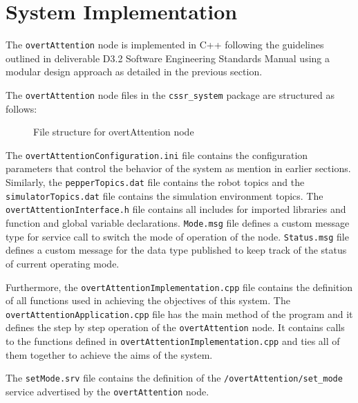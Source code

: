 \documentclass{CSSRforAfrica}
\begin{document}
\newpage
\section{System Implementation}
The \texttt{overtAttention} node is implemented in C++ following the guidelines outlined in deliverable D3.2 Software Engineering Standards Manual using a modular design approach as detailed in the previous section.

The \texttt{overtAttention} node files in the \texttt{cssr\_system} package are structured as follows:
\vspace{0.5cm}
\begin{figure}[h!]
	\renewcommand*\DTstyle{\ttfamily}
	\caption{File structure for overtAttention node}
\end{figure}

The \texttt{overtAttentionConfiguration.ini} file contains the configuration parameters that control the behavior of the system as mention in earlier sections. Similarly, the \texttt{pepperTopics.dat} file contains the robot topics and the \texttt{simulatorTopics.dat} file contains the simulation environment topics. The \texttt{overtAttentionInterface.h} file contains all includes for imported libraries and function and global variable declarations. \texttt{Mode.msg} file defines a custom message type for service call to switch the mode of operation of the node. \texttt{Status.msg} file defines a custom message for the data type published to keep track of the status of current operating mode.

Furthermore, the \texttt{overtAttentionImplementation.cpp} file contains the definition of all functions used in achieving the objectives of this system. The \texttt{overtAttentionApplication.cpp} file has the main method of the program and it defines the step by step operation of the \texttt{overtAttention} node. It contains calls to the functions defined in \texttt{overtAttentionImplementation.cpp} and ties all of them together to achieve the aims of the system.

The \texttt{setMode.srv} file contains the definition of the \texttt{/overtAttention/set\_mode} service advertised by the \texttt{overtAttention} node.
\end{document}
